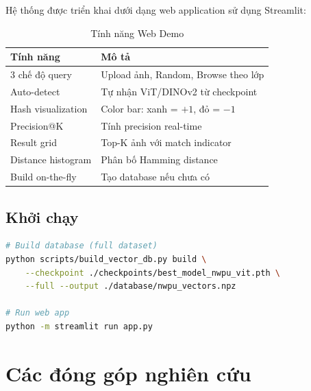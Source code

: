 \documentclass[13pt,a4paper]{article}
\begin{document}
Hệ thống được triển khai dưới dạng web application sử dụng Streamlit:

\begin{table}[H]
\centering
\caption{Tính năng Web Demo}
\label{tab:web_features}
\begin{tabular}{ll}
\toprule
\textbf{Tính năng} & \textbf{Mô tả} \\
\midrule
3 chế độ query   & Upload ảnh, Random, Browse theo lớp \\
Auto-detect      & Tự nhận ViT/DINOv2 từ checkpoint \\
Hash visualization & Color bar: xanh = $+1$, đỏ = $-1$ \\
Precision@K      & Tính precision real-time \\
Result grid      & Top-K ảnh với match indicator \\
Distance histogram & Phân bố Hamming distance \\
Build on-the-fly & Tạo database nếu chưa có \\
\bottomrule
\end{tabular}
\end{table}

\subsection{Khởi chạy}

\begin{lstlisting}[language=bash, caption={Lệnh chạy Web Demo}]
# Build database (full dataset)
python scripts/build_vector_db.py build \
    --checkpoint ./checkpoints/best_model_nwpu_vit.pth \
    --full --output ./database/nwpu_vectors.npz

# Run web app
python -m streamlit run app.py
\end{lstlisting}


\section{Các đóng góp nghiên cứu}
\end{document}
